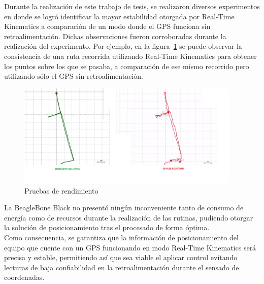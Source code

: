 Durante la realización de este trabajo de tesis, se realizaron diversos experimentos en donde se logró identificar la mayor estabilidad otorgada por Real-Time Kinematics a comparación de un modo donde el GPS funciona sin retroalimentación. Dichas observaciones fueron corroboradas durante la realización del experimento. Por ejemplo, en la figura~\ref{fig:Pruebas} se puede observar la consistencia de una ruta recorrida utilizando Real-Time Kinematics para obtener los puntos sobre los que se pasaba, a comparación de ese mismo recorrido pero utilizando sólo el GPS sin retroalimentación.\\

\begin{figure}[H]
\centering
\includegraphics[width=0.95\textwidth]{Figures/MovimientosPrueba}
\caption[Pruebas de rendimiento.]{Pruebas de rendimiento}
\label{fig:Pruebas}
\end{figure}

La BeagleBone Black no presentó ningún inconveniente tanto de consumo de energía como de recursos durante la realización de las rutinas, pudiendo otorgar la solución de posicionamiento tras el procesado de forma óptima.\\

Como consecuencia, se garantiza que la información de posicionamiento del equipo que cuente con un GPS funcionando en modo Real-Time Kinematics será precisa y estable, permitiendo así que sea viable el aplicar control evitando lecturas de baja confiabilidad en la retroalimentación durante el sensado de coordenadas.